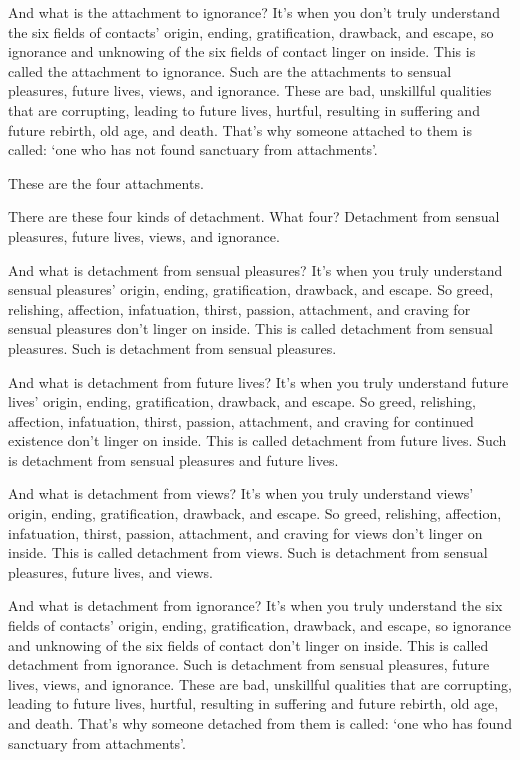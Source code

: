 \documentclass[12pt,openany]{book}%
\begin{document}
And what is the attachment to ignorance? It’s when you don’t truly understand the six fields of contacts’ origin, ending, gratification, drawback, and escape, so ignorance and unknowing of the six fields of contact linger on inside. This is called the attachment to ignorance. Such are the attachments to sensual pleasures, future lives, views, and ignorance. These are bad, unskillful qualities that are corrupting, leading to future lives, hurtful, resulting in suffering and future rebirth, old age, and death. That’s why someone attached to them is called: ‘one who has not found sanctuary from attachments’. 

These are the four attachments. 

There are these four kinds of detachment. What four? Detachment from sensual pleasures, future lives, views, and ignorance. 

And what is detachment from sensual pleasures? It’s when you truly understand sensual pleasures’ origin, ending, gratification, drawback, and escape. So greed, relishing, affection, infatuation, thirst, passion, attachment, and craving for sensual pleasures don’t linger on inside. This is called detachment from sensual pleasures. Such is detachment from sensual pleasures. 

And what is detachment from future lives? It’s when you truly understand future lives’ origin, ending, gratification, drawback, and escape. So greed, relishing, affection, infatuation, thirst, passion, attachment, and craving for continued existence don’t linger on inside. This is called detachment from future lives. Such is detachment from sensual pleasures and future lives. 

And what is detachment from views? It’s when you truly understand views’ origin, ending, gratification, drawback, and escape. So greed, relishing, affection, infatuation, thirst, passion, attachment, and craving for views don’t linger on inside. This is called detachment from views. Such is detachment from sensual pleasures, future lives, and views. 

And what is detachment from ignorance? It’s when you truly understand the six fields of contacts’ origin, ending, gratification, drawback, and escape, so ignorance and unknowing of the six fields of contact don’t linger on inside. This is called detachment from ignorance. Such is detachment from sensual pleasures, future lives, views, and ignorance. These are bad, unskillful qualities that are corrupting, leading to future lives, hurtful, resulting in suffering and future rebirth, old age, and death. That’s why someone detached from them is called: ‘one who has found sanctuary from attachments’. 
\end{document}
